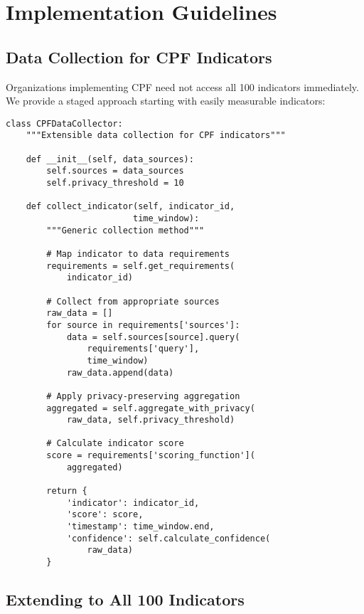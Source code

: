 \documentclass[10pt,twocolumn]{IEEEtran}
\begin{document}
\section{Implementation Guidelines}

\subsection{Data Collection for CPF Indicators}

Organizations implementing CPF need not access all 100 indicators immediately. We provide a staged approach starting with easily measurable indicators:

\begin{lstlisting}[caption={CPF Data Collection Framework},label={lst:collection}]
class CPFDataCollector:
    """Extensible data collection for CPF indicators"""
    
    def __init__(self, data_sources):
        self.sources = data_sources  
        self.privacy_threshold = 10  
        
    def collect_indicator(self, indicator_id, 
                         time_window):
        """Generic collection method"""
        
        # Map indicator to data requirements
        requirements = self.get_requirements(
            indicator_id)
        
        # Collect from appropriate sources
        raw_data = []
        for source in requirements['sources']:
            data = self.sources[source].query(
                requirements['query'],
                time_window)
            raw_data.append(data)
        
        # Apply privacy-preserving aggregation
        aggregated = self.aggregate_with_privacy(
            raw_data, self.privacy_threshold)
        
        # Calculate indicator score
        score = requirements['scoring_function'](
            aggregated)
        
        return {
            'indicator': indicator_id,
            'score': score,
            'timestamp': time_window.end,
            'confidence': self.calculate_confidence(
                raw_data)
        }
\end{lstlisting}

\subsection{Extending to All 100 Indicators}
\end{document}
